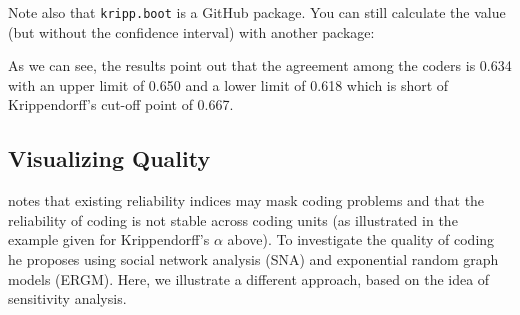 \documentclass[
]{article}
\newenvironment{Shaded}{\begin{snugshade}}{\end{snugshade}}
\newcommand{\AttributeTok}[1]{\textcolor[rgb]{0.77,0.63,0.00}{#1}}
\newcommand{\DecValTok}[1]{\textcolor[rgb]{0.00,0.00,0.81}{#1}}
\newcommand{\FunctionTok}[1]{\textcolor[rgb]{0.00,0.00,0.00}{#1}}
\newcommand{\NormalTok}[1]{#1}
\newcommand{\OtherTok}[1]{\textcolor[rgb]{0.56,0.35,0.01}{#1}}
\newcommand{\SpecialCharTok}[1]{\textcolor[rgb]{0.00,0.00,0.00}{#1}}
\newcommand{\StringTok}[1]{\textcolor[rgb]{0.31,0.60,0.02}{#1}}
\begin{document}
\begin{Shaded}
\end{Shaded}

Note also that \texttt{kripp.boot} is a GitHub package. You can still calculate the value (but without the confidence interval) with another package:

\begin{Shaded}
\end{Shaded}

As we can see, the results point out that the agreement among the coders is 0.634 with an upper limit of 0.650 and a lower limit of 0.618 which is short of Krippendorff's cut-off point of 0.667.

\hypertarget{visualizing-quality}{%
\subsection{Visualizing Quality}\label{visualizing-quality}}

\textcite{Lamprianou2020a} notes that existing reliability indices may mask coding problems and that the reliability of coding is not stable across coding units (as illustrated in the example given for Krippendorff's \(\alpha\) above). To investigate the quality of coding he proposes using social network analysis (SNA) and exponential random graph models (ERGM). Here, we illustrate a different approach, based on the idea of sensitivity analysis.
\end{document}
